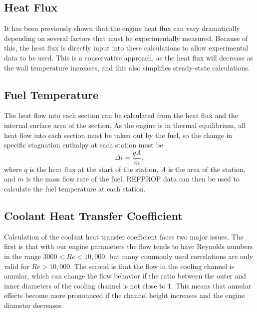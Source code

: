 \documentclass[11pt]{article}
\begin{document}
\subsection{Heat Flux}

It has been previously shown that the engine heat flux can vary dramatically depending on several factors that must be experimentally measured. Because of this, the heat flux is directly input into these calculations to allow experimental data to be used. This is a conservative approach, as the heat flux will decrease as the wall temperature increases, and this also simplifies steady-state calculations.

\subsection{Fuel Temperature}
The heat flow into each section can be calculated from the heat flux and the internal surface area of the section. As the engine is in thermal equilibrium, all heat flow into each section must be taken out by the fuel, so the change in specific stagnation enthalpy at each station must be~\cite{naraghi_simple_2008}
\begin{equation}
  \Delta i = \frac{q A}{\dot{m}},
\end{equation}
where $q$ is the heat flux at the start of the station, $A$ is the area of the station, and $\dot{m}$ is the mass flow rate of the fuel. REFPROP data can then be used to calculate the fuel temperature at each station.

\subsection{Coolant Heat Transfer Coefficient}\label{sec:coefficient}

Calculation of the coolant heat transfer coefficient faces two major issues. The first is that with our engine parameters the flow tends to have Reynolds numbers in the range $3000 < Re < 10,000$, but many commonly used correlations are only valid for $Re > 10,000$. The second is that the flow in the cooling channel is annular, which can change the flow behavior if the ratio between the outer and inner diameters of the cooling channel is not close to 1. This means that annular effects become more pronounced if the channel height increases and the engine diameter decreases.
\end{document}
